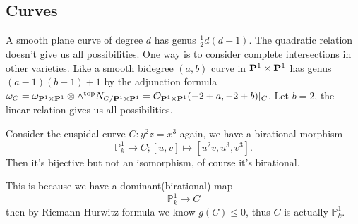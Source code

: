 \documentclass[../main.tex]{subfiles}
\begin{document}
\subsection{Curves}
\begin{example}
A smooth plane curve of degree $d$ has genus $\frac{1}{2}d(d-1)$. The quadratic relation doesn't give us all possibilities. One way is to consider complete intersections in other varieties. Like a smooth bidegree $(a,b)$ curve in $\P^1\times \P^1$ has genus  $(a-1)(b-1)+1$ by the adjunction formula $\omega_{C}=\omega_{\P^1\times\P^1}\otimes \wedge^{\text{top}}N_{C/\P^1\times \P^1}=\O_{\P^1\times\P^1}(-2+a,-2+b)|_{C}$. Let $b=2$, the linear relation gives us all possibilities. 
\end{example}


\begin{example}
Consider the cuspidal curve $C:y^{2}z=x^{3}$ again, we have a birational morphism
$$\mathbb{P}_{k}^{1}\rightarrow C; [u,v]\mapsto [u^{2}v,u^{3},v^{3}].$$
Then it's bijective but not an isomorphism, of course it's birational.
\end{example}
\begin{remark}
This is because we have a dominant(birational) map $$\mathbb{P}_{k}^{1}\rightarrow C$$
then by Riemann-Hurwitz formula we know $g(C)\leq 0$, thus $C$ is actually $\mathbb{P}_{k}^{1}$.
\end{remark}
\end{document}
